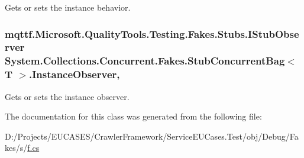 Gets or sets the instance behavior.

\hypertarget{class_system_1_1_collections_1_1_concurrent_1_1_fakes_1_1_stub_concurrent_bag_3_01_t_01_4_a2236033efcc770cef9a340aa2d85105d}{
\subsubsection[{Instance\-Observer}]{\setlength{\rightskip}{0pt plus 5cm}mqttf.\-Microsoft.\-Quality\-Tools.\-Testing.\-Fakes.\-Stubs.\-I\-Stub\-Observer System.\-Collections.\-Concurrent.\-Fakes.\-Stub\-Concurrent\-Bag$<$ T $>$.Instance\-Observer\hspace{0.3cm}{\ttfamily [get]}, {\ttfamily [set]}}}\label{class_system_1_1_collections_1_1_concurrent_1_1_fakes_1_1_stub_concurrent_bag_3_01_t_01_4_a2236033efcc770cef9a340aa2d85105d}


Gets or sets the instance observer.



The documentation for this class was generated from the following file\-:\begin{DoxyCompactItemize}
\item 
D\-:/\-Projects/\-E\-U\-C\-A\-S\-E\-S/\-Crawler\-Framework/\-Service\-E\-U\-Cases.\-Test/obj/\-Debug/\-Fakes/s/\hyperlink{s_2f_8cs}{f.\-cs}\end{DoxyCompactItemize}
